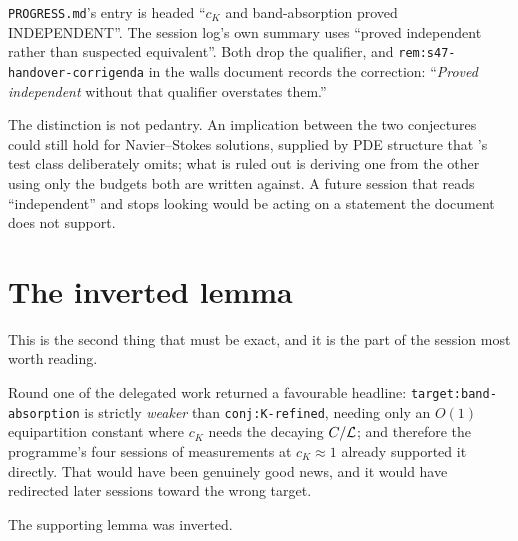 \begin{obsv}
\label{obs:not-independent}
\texttt{PROGRESS.md}'s  entry is headed ``\(c_K\) and band-absorption
proved INDEPENDENT''. The session log's own summary uses ``proved independent
rather than suspected equivalent''. Both drop the qualifier, and
\texttt{rem:s47-handover-corrigenda} in the walls document records the
correction: ``\emph{Proved independent} without that qualifier overstates
them.''

\smallskip
The distinction is not pedantry. An implication between the two conjectures
could still hold for Navier--Stokes solutions, supplied by PDE structure that
's test class deliberately omits; what is ruled out is deriving one
from the other using only the budgets both are written against. A future
session that reads ``independent'' and stops looking would be acting on a
statement the document does not support.
\end{obsv}

\section{The inverted lemma}
\label{sec:s44-inversion}

This is the second thing that must be exact, and it is the part of the session
most worth reading.

Round one of the delegated work returned a favourable headline:
\texttt{target:band-absorption} is strictly \emph{weaker} than
\texttt{conj:K-refined}, needing only an \(O(1)\) equipartition constant where
\(c_K\) needs the decaying \(C/\mathcal{L}\); and therefore the programme's four
sessions of measurements at \(c_K\approx1\) already supported it directly.
That would have been genuinely good news, and it would have redirected later
sessions toward the wrong target.

The supporting lemma was inverted.

